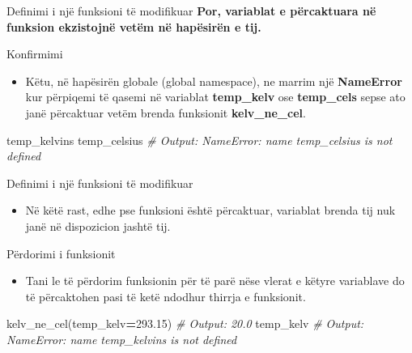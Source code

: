\documentclass[
  ignorenonframetext,
]{beamer}
\newenvironment{Shaded}{\begin{snugshade}}{\end{snugshade}}
\newcommand{\CommentTok}[1]{\textcolor[rgb]{0.56,0.35,0.01}{\textit{#1}}}
\newcommand{\FloatTok}[1]{\textcolor[rgb]{0.00,0.00,0.81}{#1}}
\newcommand{\NormalTok}[1]{#1}
\newcommand{\OperatorTok}[1]{\textcolor[rgb]{0.81,0.36,0.00}{\textbf{#1}}}
\providecommand{\tightlist}{%
  \setlength{\itemsep}{0pt}\setlength{\parskip}{0pt}}
\begin{document}
\begin{frame}{Definimi i një funksioni të modifikuar}
\protect\hypertarget{definimi-i-njuxeb-funksioni-tuxeb-modifikuar-2}{}
\textbf{Por, variablat e përcaktuara në funksion ekzistojnë vetëm në
hapësirën e tij.}
\end{frame}

\begin{frame}[fragile]{Konfirmimi}
\protect\hypertarget{konfirmimi}{}
\begin{itemize}
\tightlist
\item
  Këtu, në hapësirën globale (global namespace), ne marrim një
  \textbf{NameError} kur përpiqemi të qasemi në variablat
  \textbf{temp\_kelv} ose \textbf{temp\_cels} sepse ato janë përcaktuar
  vetëm brenda funksionit \textbf{kelv\_ne\_cel}.
\end{itemize}

\begin{Shaded}
\begin{Highlighting}[]
\NormalTok{temp\_kelvins}
\NormalTok{temp\_celsius}
\CommentTok{\# Output: NameError: name \textquotesingle{}temp\_celsius\textquotesingle{} is not defined}
\end{Highlighting}
\end{Shaded}
\end{frame}

\begin{frame}{Definimi i një funksioni të modifikuar}
\protect\hypertarget{definimi-i-njuxeb-funksioni-tuxeb-modifikuar-3}{}
\begin{itemize}
\tightlist
\item
  Në këtë rast, edhe pse funksioni është përcaktuar, variablat brenda
  tij nuk janë në dispozicion jashtë tij.
\end{itemize}
\end{frame}

\begin{frame}[fragile]{Përdorimi i funksionit}
\protect\hypertarget{puxebrdorimi-i-funksionit}{}
\begin{itemize}
\tightlist
\item
  Tani le të përdorim funksionin për të parë nëse vlerat e këtyre
  variablave do të përcaktohen pasi të ketë ndodhur thirrja e
  funksionit.
\end{itemize}

\begin{Shaded}
\begin{Highlighting}[]
\NormalTok{kelv\_ne\_cel(temp\_kelv}\OperatorTok{=}\FloatTok{293.15}\NormalTok{)}
\CommentTok{\# Output: 20.0}
\NormalTok{temp\_kelv}
\CommentTok{\# Output: NameError: name \textquotesingle{}temp\_kelvins\textquotesingle{} is not defined}
\end{Highlighting}
\end{Shaded}
\end{frame}
\end{document}
